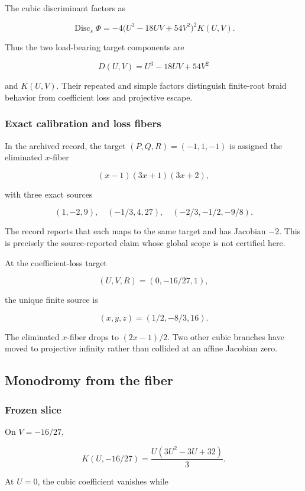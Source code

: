The cubic discriminant factors as

\[
\operatorname{Disc}_s\Phi
=-4\bigl(U^3-18UV+54V^2\bigr)^2K(U,V).
\]

Thus the two load-bearing target components are

\[
D(U,V)=U^3-18UV+54V^2
\]

and \(K(U,V)\). Their repeated and simple factors distinguish
finite-root braid behavior from coefficient loss and projective escape.

\subsubsection{Exact calibration and loss
fibers}\label{viii-ch11-exact-calibration-and-loss-fibers}

In the archived record, the target \((P,Q,R)=(-1,1,-1)\) is assigned the eliminated \(x\)-fiber

\[
(x-1)(3x+1)(3x+2),
\]

with three exact sources

\[
(1,-2,9),
\quad
(-1/3,4,27),
\quad
(-2/3,-1/2,-9/8).
\]

The record reports that each maps to the same target and has Jacobian
\(-2\). This is precisely the source-reported claim whose global scope
is not certified here.

At the coefficient-loss target

\[
(U,V,R)=(0,-16/27,1),
\]

the unique finite source is

\[
(x,y,z)=(1/2,-8/3,16).
\]

The eliminated \(x\)-fiber drops to \((2x-1)/2\). Two other cubic
branches have moved to projective infinity rather than collided at an
affine Jacobian zero.

\subsection{Monodromy from the fiber}\label{viii-ch11-monodromy-from-the-fiber}

\subsubsection{Frozen slice}\label{viii-ch11-frozen-slice}

On \(V=-16/27\),

\[
K(U,-16/27)=\frac{U(3U^2-3U+32)}3.
\]

At \(U=0\), the cubic coefficient vanishes while

